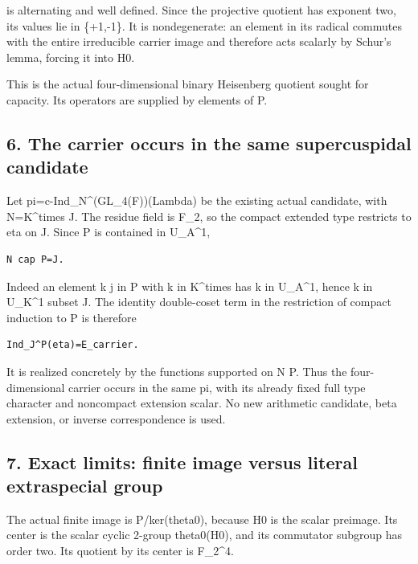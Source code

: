 is alternating and well defined. Since the projective quotient has
exponent two, its values lie in \{+1,-1\}. It is nondegenerate: an
element in its radical commutes with the entire irreducible carrier
image and therefore acts scalarly by Schur's lemma, forcing it into H0.

This is the actual four-dimensional binary Heisenberg quotient sought
for capacity. Its operators are supplied by elements of P.

\hypertarget{rank4-the-carrier-occurs-in-the-same-supercuspidal-candidate}{%
\subsection{6. The carrier occurs in the same supercuspidal
candidate}\label{rank4-the-carrier-occurs-in-the-same-supercuspidal-candidate}}

Let pi=c-Ind\_N\^{}(GL\_4(F))(Lambda) be the existing actual candidate,
with N=K\^{}times J. The residue field is F\_2, so the compact extended
type restricts to eta on J. Since P is contained in U\_A\^{}1,

\begin{Verbatim}[fontsize=\small,breaklines=true,breakanywhere=true]
N cap P=J.
\end{Verbatim}

Indeed an element k j in P with k in K\^{}times has k in U\_A\^{}1,
hence k in U\_K\^{}1 subset J. The identity double-coset term in the
restriction of compact induction to P is therefore

\begin{Verbatim}[fontsize=\small,breaklines=true,breakanywhere=true]
Ind_J^P(eta)=E_carrier.
\end{Verbatim}

It is realized concretely by the functions supported on N P. Thus the
four-dimensional carrier occurs in the same pi, with its already fixed
full type character and noncompact extension scalar. No new arithmetic
candidate, beta extension, or inverse correspondence is used.

\hypertarget{rank4-exact-limits-finite-image-versus-literal-extraspecial-group}{%
\subsection{7. Exact limits: finite image versus literal extraspecial
group}\label{rank4-exact-limits-finite-image-versus-literal-extraspecial-group}}

The actual finite image is P/ker(theta0), because H0 is the scalar
preimage. Its center is the scalar cyclic 2-group theta0(H0), and its
commutator subgroup has order two. Its quotient by its center is
F\_2\^{}4.

